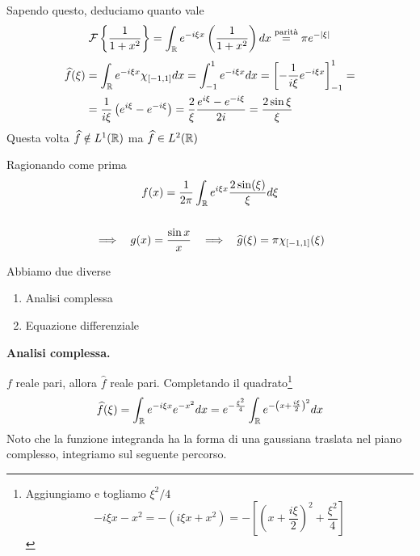 Sapendo questo, deduciamo quanto vale
\begin{equation*}
\mathcal{F} \left\{\frac{1}{1 + x^{2}}\right\} = \int_{\mathbb{R}} e^{- i\xi x}\left(\frac{1}{1 + x^{2}}\right) dx\overset{\text{parità}}{=} \pi e^{- | \xi |}
\end{equation*}
\Soluzione
\begin{equation*}
\begin{aligned}
\widehat{f} (\xi) & = \int_{\mathbb{R}} e^{- i\xi x} \chi_{[ - 1, 1]} dx = \int^{1}_{- 1} e^{- i\xi x} dx = \left[ - \frac{1}{i\xi} e^{- i\xi x}\right]^{1}_{- 1} = \\
 & = \frac{1}{i\xi}\left(e^{i\xi} - e^{- i\xi}\right) = \frac{2}{\xi}\frac{e^{i\xi} - e^{- i\xi}}{2i} = \frac{2\sin \xi}{\xi}
\end{aligned}
\end{equation*}
Questa volta $\widehat{f} \notin L^{1} (\mathbb{R})$ ma $\widehat{f} \in L^{2} (\mathbb{R})$

Ragionando come prima
\begin{gather*}
f(x) = \frac{1}{2\pi}\int_{\mathbb{R}} e^{i\xi x}\frac{2\sin(\xi)}{\xi} d\xi \\
\\
\implies \ \ g(x) = \frac{\sin x}{x} \ \ \implies \ \ \widehat{g}(\xi) = \pi \chi_{[ - 1, 1]} (\xi)
\end{gather*}
\Soluzione

Abbiamo due diverse
\begin{enumerate}
\item Analisi complessa
\item Equazione differenziale
\end{enumerate}

\textbf{Analisi complessa.}

$f$ reale pari, allora $\hat{f}$ reale pari. Completando il quadrato\footnote{Aggiungiamo e togliamo $\xi^{2} /4$
\begin{equation*}
- i\xi x - x^{2} = - \left(i\xi x + x^{2}\right) = - \left[\left(x + \frac{i\xi}{2}\right)^{2} + \frac{\xi^{2}}{4}\right]
\end{equation*}
}
\begin{equation*}
\widehat{f} (\xi) = \int_{\mathbb{R}} e^{- i\xi x} e^{- x^{2}} dx = e^{- \frac{\xi^{2}}{4}}\int_{\mathbb{R}} e^{- \left(x + \frac{i\xi}{2}\right)^{2}} dx
\end{equation*}
Noto che la funzione integranda ha la forma di una gaussiana traslata nel piano complesso, integriamo sul seguente percorso.


